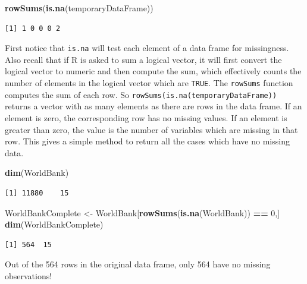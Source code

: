 \documentclass[
]{krantz}
\makeatletter
\newenvironment{Shaded}{\begin{snugshade}}{\end{snugshade}}
\newcommand{\DecValTok}[1]{\textcolor[rgb]{0.06,0.06,0.06}{#1}}
\newcommand{\KeywordTok}[1]{\textcolor[rgb]{0.27,0.27,0.27}{\textbf{#1}}}
\newcommand{\NormalTok}[1]{#1}
\newcommand{\OperatorTok}[1]{\textcolor[rgb]{0.43,0.43,0.43}{\textbf{#1}}}
\newcommand{\StringTok}[1]{\textcolor[rgb]{0.5,0.5,0.5}{#1}}
\newenvironment{kframe}{%
\medskip{}
\setlength{\fboxsep}{.8em}
 \def\at@end@of@kframe{}%
 \ifinner\ifhmode%
  \def\at@end@of@kframe{\end{minipage}}%
  \begin{minipage}{\columnwidth}%
 \fi\fi%
 \def\FrameCommand##1{\hskip\@totalleftmargin \hskip-\fboxsep
 \colorbox{shadecolor}{##1}\hskip-\fboxsep
     \hskip-\linewidth \hskip-\@totalleftmargin \hskip\columnwidth}%
 \MakeFramed {\advance\hsize-\width
   \@totalleftmargin\z@ \linewidth\hsize
   \@setminipage}}%
 {\par\unskip\endMakeFramed%
 \at@end@of@kframe}
\renewenvironment{Shaded}{\begin{kframe}}{\end{kframe}}
\makeatother
\begin{document}
\begin{Shaded}
\begin{Highlighting}[]
\KeywordTok{rowSums}\NormalTok{(}\KeywordTok{is.na}\NormalTok{(temporaryDataFrame))}
\end{Highlighting}
\end{Shaded}

\begin{verbatim}
[1] 1 0 0 0 2
\end{verbatim}

First notice that \texttt{is.na} will test each element of a data frame for missingness. Also recall that if R is asked to sum a logical vector, it will first convert the logical vector to numeric and then compute the sum, which effectively counts the number of elements in the logical vector which are \texttt{TRUE}. The \texttt{rowSums} function computes the sum of each row. So \texttt{rowSums(is.na(temporaryDataFrame))} returns a vector with as many elements as there are rows in the data frame. If an element is zero, the corresponding row has no missing values. If an element is greater than zero, the value is the number of variables which are missing in that row. This gives a simple method to return all the cases which have no missing data.

\begin{Shaded}
\begin{Highlighting}[]
\KeywordTok{dim}\NormalTok{(WorldBank)}
\end{Highlighting}
\end{Shaded}

\begin{verbatim}
[1] 11880    15
\end{verbatim}

\begin{Shaded}
\begin{Highlighting}[]
\NormalTok{WorldBankComplete \textless{}{-}}\StringTok{ }\NormalTok{WorldBank[}\KeywordTok{rowSums}\NormalTok{(}\KeywordTok{is.na}\NormalTok{(WorldBank)) }\OperatorTok{==}\StringTok{ }\DecValTok{0}\NormalTok{,]}
\KeywordTok{dim}\NormalTok{(WorldBankComplete)}
\end{Highlighting}
\end{Shaded}

\begin{verbatim}
[1] 564  15
\end{verbatim}

Out of the 564 rows in the original data frame, only 564 have no missing observations!
\end{document}
